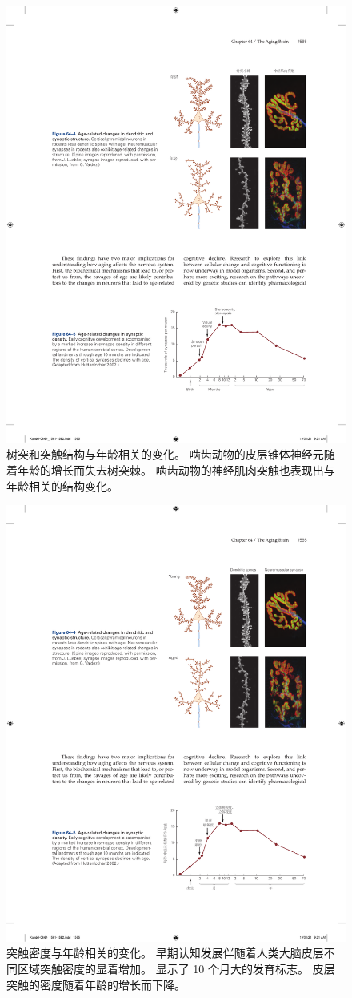 \begin{figure}[htbp]
	\centering
	\includegraphics[width=0.65\linewidth]{chap64/fig_64_4}
	\caption{树突和突触结构与年龄相关的变化。
		啮齿动物的皮层锥体神经元随着年龄的增长而失去树突棘。
		啮齿动物的神经肌肉突触也表现出与年龄相关的结构变化。}
	\label{fig:64_4}
\end{figure}


\begin{figure}[htbp]
	\centering
	\includegraphics[width=0.65\linewidth]{chap64/fig_64_5}
	\caption{突触密度与年龄相关的变化。
		早期认知发展伴随着人类大脑皮层不同区域突触密度的显着增加。
		显示了 10 个月大的发育标志。
		皮层突触的密度随着年龄的增长而下降\cite{huttenlocher2009neural}。}
	\label{fig:64_5}
\end{figure}


